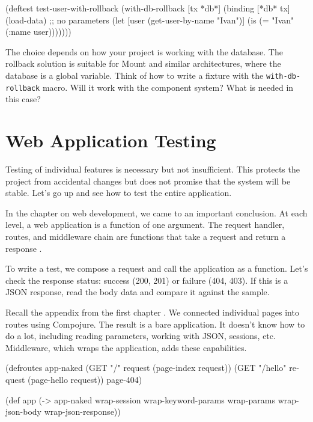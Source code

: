 \else

\begin{english}
  \begin{clojure}
(deftest test-user-with-rollback
  (with-db-rollback [tx *db*]
    (binding [*db* tx]
      (load-data) ;; no parameters
      (let [user (get-user-by-name "Ivan")]
        (is (= "Ivan" (:name user)))))))
  \end{clojure}
\end{english}

\fi

The choice depends on how your project is working with the database. The rollback solution is suitable for Mount and similar architectures, where the database is a global variable. Think of how to write a fixture with the \verb|with-db-rollback| macro. Will it work with the component system? What is needed in this case?

\section{Web Application Testing}


Testing of individual features is necessary but not insufficient. This protects the project from accidental changes but does not promise that the system will be stable. Let's go up and see how to test the entire application.

In the chapter on web development, we came to an important conclusion. At each level, a web application is a function of one argument. The request handler, routes, and middleware chain are functions that take a request and return a response .

To write a test, we compose a request and call the application as a function. Let's check the response status: success (200, 201) or failure (404, 403). If this is a JSON response, read the body data and compare it against the sample.

Recall the appendix from the first chapter . We connected individual pages into routes using Compojure. The result is a bare application. It doesn't know how to do a lot, including reading parameters, working with JSON, sessions, etc. Middleware, which wraps the application, adds these capabilities.


\ifx\DEVICETYPE\MOBILE

\begin{english}
  \begin{clojure}
(defroutes app-naked
  (GET "/"
    request (page-index request))
  (GET "/hello"
    request (page-hello request))
  page-404)

(def app
  (-> app-naked
      wrap-session
      wrap-keyword-params
      wrap-params
      wrap-json-body
      wrap-json-response))
  \end{clojure}
\end{english}

